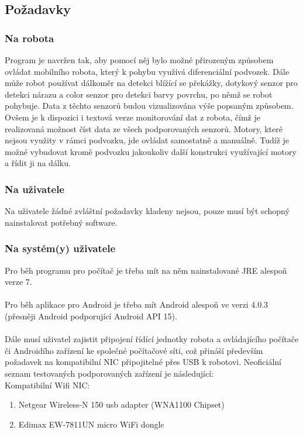 \documentclass[12pt, ngerman]{article}
\begin{document}
\subsection{Požadavky}
\subsubsection{Na robota}
Program je navržen tak, aby pomocí něj bylo možné přirozeným způsobem ovládat  mobilního robota, který k pohybu využívá diferenciální podvozek. Dále může robot používat dálkoměr na detekci blížící se překážky, dotykový senzor pro detekci nárazu a color senzor pro detekci barvy povrchu, po němž se robot pohybuje. Data z těchto senzorů budou vizualizována výše popsaným způsobem. Ovšem je k dispozici i textová verze monitorování dat z robota, čímž je realizovaná možnost číst data ze všech podporovaných senzorů. Motory, které nejsou využity v rámci podvozku, jde ovládat samostatně a manuálně. Tudíž je možné vybudovat kromě podvozku jakoukoliv další konstrukci využívající motory a řídit ji na dálku.

\subsubsection{Na uživatele}
Na uživatele žádné zvláštní požadavky kladeny nejsou, pouze musí být schopný nainstalovat potřebný software.

\subsubsection{Na systém(y) uživatele}
Pro běh programu pro počítač je třeba mít na něm nainstalované JRE alespoň verze 7.\\\\
Pro běh aplikace pro Android je třeba mít Android alespoň ve verzi 4.0.3 (přesněji Android podporující Android API 15).\\\\ 
Dále musí uživatel zajistit připojení řídící jednotky robota a ovládajícího počítače či Androidího zařízení ke společné počítačové síti, což přináší především požadavek na kompatibilní NIC připojitelné přes USB k robotovi. Neoficiální seznam testovaných podporovaných zařízení je následující:\\

Kompatibilní Wifi NIC:
\begin{enumerate}[leftmargin=5mm]
\item Netgear Wireless-N 150 usb adapter (WNA1100 Chipset)
\item Edimax EW-7811UN micro WiFi dongle
\end{enumerate} 
\end{document}
